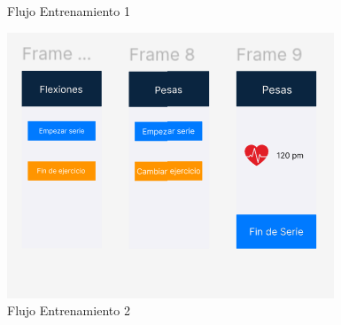 \begin{figure}[H]
\begin{minipage}[b]{0.45\textwidth}
    \caption{Flujo Entrenamiento 1}
    \label{fig:Flujo Entrenamiento 1}
  \end{minipage}
  \begin{minipage}[b]{0.45\textwidth}
    \centering
    \includegraphics[width=\textwidth]{fotos/FE2.png}
    \caption{Flujo Entrenamiento 2}
    \label{fig:Flujo Entrenamiento 2}
  \end{minipage}
  \begin{minipage}[b]{0.45\textwidth}
    \centering

\end{minipage}
\end{figure}
